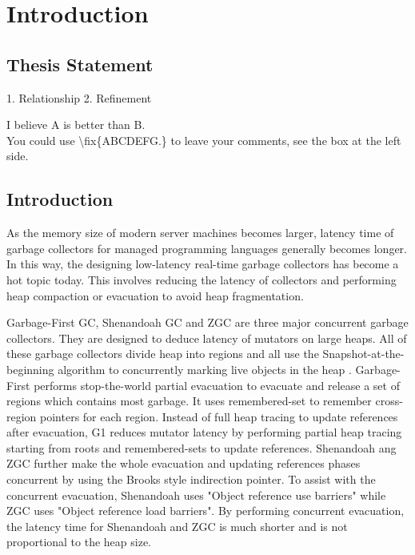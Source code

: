 \chapter{Introduction}
\label{cha:intro}


\section{Thesis Statement}
\label{sec:thesisstatement}
1. Relationship 
2. Refinement

I believe A is better than B.\\
You could use \textbackslash fix\{ABCDEFG.\} to
leave your comments, see the box at the left side.  

\section{Introduction}
\label{sec:problemstatement}

As the memory size of modern server machines becomes larger, latency time of
garbage collectors for managed programming languages generally becomes longer.
In this way, the designing low-latency real-time garbage collectors has become
a hot topic today. This involves reducing the latency of collectors and
performing heap compaction or evacuation to avoid heap fragmentation.

Garbage-First GC, Shenandoah GC and ZGC are three major concurrent garbage
collectors. They are designed to deduce latency of mutators on large heaps.
All of these garbage collectors divide heap into regions and all use the
Snapshot-at-the-beginning algorithm to concurrently marking
live objects in the heap \cite{yuasa1990real}. Garbage-First performs stop-the-world partial
evacuation to evacuate and release a set of regions which contains most garbage.
It uses remembered-set to remember cross-region pointers for each region.
Instead of full heap tracing to update references after evacuation, G1 reduces
mutator latency by performing partial heap tracing starting from roots and
remembered-sets to update references. Shenandoah ang ZGC further make the whole
evacuation and updating references phases concurrent by using the Brooks style
indirection pointer. To assist with the concurrent evacuation, Shenandoah uses
"Object reference use barriers" while ZGC uses "Object reference load barriers".
By performing concurrent evacuation, the latency time for Shenandoah and ZGC is
much shorter and is not proportional to the heap size.

